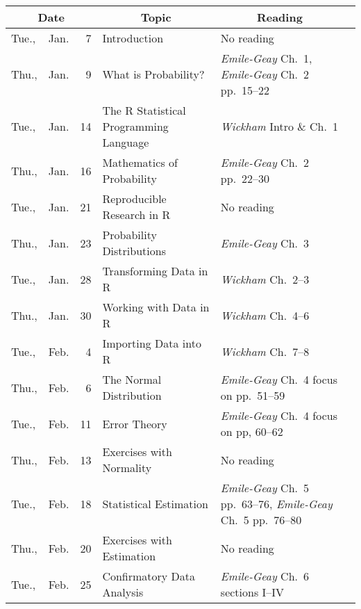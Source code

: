 \documentclass[11pt,twoside]{jgsyllabus}\usepackage[]{graphicx}\usepackage[]{xcolor}
\begin{document}
\setlength{\aboverulesep}{0.2ex}
\setlength{\belowrulesep}{0.2ex}
\setlength{\extrarowheight}{0.1ex}
\setlength{\heavyrulewidth}{0.5pt}
\setlength{\lightrulewidth}{0.05pt}
\begin{center}
\begin{tabular}{l@{~}c@{~}r>{\raggedright}m{2.6in}>{\centering}m{2in}c}
  \toprule
  \multicolumn{3}{c}{\bfseries Date} & \multicolumn{1}{c}{\bfseries Topic} &\multicolumn{1}{c}{\bfseries Reading} &\\
 \midrule
Tue., & Jan. &   7 & Introduction & No reading &  \\
   \midrule
Thu., & Jan. &   9 & What is Probability? & \emph{Emile-Geay\/} Ch.~1, \emph{Emile-Geay\/} Ch.~2 pp.~15--22 &  \\
   \midrule
Tue., & Jan. &  14 & The R Statistical Programming Language & \emph{Wickham\/} Intro \& Ch.~1 &  \\
   \midrule
Thu., & Jan. &  16 & Mathematics of Probability & \emph{Emile-Geay\/} Ch.~2 pp.~22--30 &  \\
   \midrule
Tue., & Jan. &  21 & Reproducible Research in R & No reading &  \\
   \midrule
Thu., & Jan. &  23 & Probability Distributions & \emph{Emile-Geay\/} Ch.~3 &  \\
   \midrule
Tue., & Jan. &  28 & Transforming Data in R & \emph{Wickham\/} Ch.~2--3 &  \\
   \midrule
Thu., & Jan. &  30 & Working with Data in R & \emph{Wickham\/} Ch.~4--6 &  \\
   \midrule
Tue., & Feb. &   4 & Importing Data into R & \emph{Wickham\/} Ch.~7--8 &  \\
   \midrule
Thu., & Feb. &   6 & The Normal Distribution & \emph{Emile-Geay\/} Ch.~4 focus on pp.~51--59 &  \\
   \midrule
Tue., & Feb. &  11 & Error Theory & \emph{Emile-Geay\/} Ch.~4 focus on pp, 60--62 &  \\
   \midrule
Thu., & Feb. &  13 & Exercises with Normality & No reading &  \\
   \midrule
Tue., & Feb. &  18 & Statistical Estimation & \emph{Emile-Geay\/} Ch.~5 pp.~63--76, \emph{Emile-Geay\/} Ch.~5 pp.~76--80 &  \\
   \midrule
Thu., & Feb. &  20 & Exercises with Estimation & No reading &  \\
   \midrule
Tue., & Feb. &  25 & Confirmatory Data Analysis & \emph{Emile-Geay\/} Ch.~6 sections I--IV &  \\

\end{tabular}
\end{center}
\end{document}
